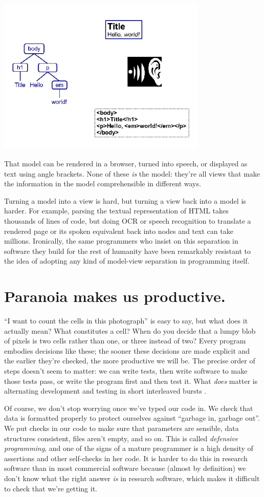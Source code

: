 \documentclass[10pt,letterpaper]{article}
\newcommand{\rulemajor}[1]{\section{#1}}
\begin{document}
\includegraphics[width=10.0cm]{modelview.png}

\noindent
That model can be rendered in a browser, turned into speech, or displayed as
text using angle brackets.  None of these \emph{is} the model: they're all views
that make the information in the model comprehensible in different ways.

Turning a model into a view is hard, but turning a view back into a model is
harder.  For example, parsing the textual representation of HTML takes thousands
of lines of code, but doing OCR or speech recognition to translate a rendered
page or its spoken equivalent back into nodes and text can take millions.
Ironically, the same programmers who insist on this separation in software they
build for the rest of humanity have been remarkably resistant to the idea of
adopting any kind of model-view separation in programming itself.

\rulemajor{Paranoia makes us productive.}

``I want to count the cells in this photograph'' is easy to say, but what does
it actually mean?  What constitutes a cell?  When do you decide that a lumpy
blob of pixels is two cells rather than one, or three instead of two?  Every
program embodies decisions like these; the sooner these decisions are made
explicit and the earlier they're checked, the more productive we will be.  The
precise order of steps doesn't seem to matter: we can write tests, then write
software to make those tests pass, or write the program first and then test it.
What \emph{does} matter is alternating development and testing in short
interleaved bursts \cite{Fucc2017}.

Of course, we don't stop worrying once we've typed our code in.  We check that
data is formatted properly to protect ourselves against ``garbage in, garbage
out''.  We put checks in our code to make sure that parameters are sensible,
data structures consistent, files aren't empty, and so on.  This is called
\emph{defensive programming}, and one of the signs of a mature programmer is a
high density of assertions and other self-checks in her code.  It is harder to
do this in research software than in most commercial software because (almost by
definition) we don't know what the right answer \emph{is} in research software,
which makes it difficult to check that we're getting it.
\end{document}
